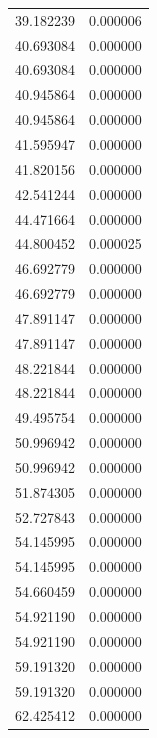 \begin{longtable}{rr}
39.182239 & 0.000006 \\
40.693084 & 0.000000 \\
40.693084 & 0.000000 \\
40.945864 & 0.000000 \\
40.945864 & 0.000000 \\
41.595947 & 0.000000 \\
41.820156 & 0.000000 \\
42.541244 & 0.000000 \\
44.471664 & 0.000000 \\
44.800452 & 0.000025 \\
46.692779 & 0.000000 \\
46.692779 & 0.000000 \\
47.891147 & 0.000000 \\
47.891147 & 0.000000 \\
48.221844 & 0.000000 \\
48.221844 & 0.000000 \\
49.495754 & 0.000000 \\
50.996942 & 0.000000 \\
50.996942 & 0.000000 \\
51.874305 & 0.000000 \\
52.727843 & 0.000000 \\
54.145995 & 0.000000 \\
54.145995 & 0.000000 \\
54.660459 & 0.000000 \\
54.921190 & 0.000000 \\
54.921190 & 0.000000 \\
59.191320 & 0.000000 \\
59.191320 & 0.000000 \\
62.425412 & 0.000000 \\
\end{longtable}
